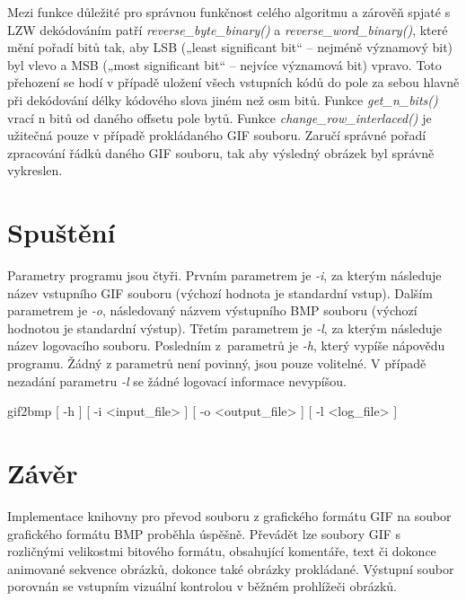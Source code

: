 \documentclass[a4paper,12pt,times]{article}
\begin{document}
Mezi funkce důležité pro správnou funkčnost celého algoritmu a zárověň spjaté s LZW dekódováním patří \textit{reverse\_byte\_binary()} a \textit{reverse\_word\_binary()}, které mění pořadí bitů tak, aby LSB („least significant bit“ – nejméně významový bit) byl vlevo a MSB („most significant bit“ – nejvíce významová bit) vpravo. Toto přehození se hodí v případě uložení všech vstupních kódů do pole za sebou hlavně při dekódování délky kódového slova jiném než osm bitů. Funkce \textit{get\_n\_bits()} vrací n bitů od  daného offsetu pole bytů. Funkce \textit{change\_row\_interlaced()} je užitečná pouze v případě prokládaného GIF souboru. Zaručí správné pořadí zpracování řádků daného GIF souboru, tak aby výsledný obrázek byl správně vykreslen.
	
\section{Spuštění}
\label{sec:spusteni}

Parametry programu jsou čtyři. Prvním parametrem je \textit{-i}, za kterým následuje název vstupního GIF souboru (výchozí hodnota je standardní vstup). Dalším parametrem je \textit{-o}, následovaný názvem výstupního BMP souboru (výchozí hodnotou je standardní výstup). Třetím parametrem je \textit{-l}, za kterým následuje název logovacího souboru. Posledním z~parametrů je \textit{-h}, který vypíše nápovědu programu. Žádný z parametrů není povinný, jsou pouze volitelné. V případě nezadání parametru \textit{-l} se žádné logovací informace nevypíšou.

\vspace{6mm}
{\centering
gif2bmp [ -h ] [ -i <input\_file> ] [ -o <output\_file> ] [ -l <log\_file> ]\par
}

\section{Závěr}

Implementace knihovny pro převod souboru z grafického formátu GIF na soubor grafického formátu BMP proběhla úspěšně. Převádět lze soubory GIF s rozličnými velikostmi bitového formátu, obsahující komentáře, text či dokonce animované sekvence obrázků, dokonce také obrázky prokládané. Výstupní soubor porovnán se vstupním vizuální kontrolou v běžném prohlížeči obrázků.

\end{document}
